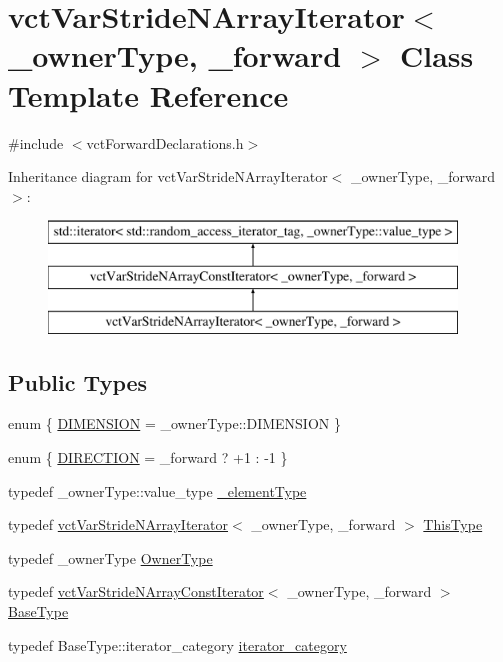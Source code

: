 \hypertarget{classvct_var_stride_n_array_iterator}{}\section{vct\+Var\+Stride\+N\+Array\+Iterator$<$ \+\_\+owner\+Type, \+\_\+forward $>$ Class Template Reference}
\label{classvct_var_stride_n_array_iterator}


{\ttfamily \#include $<$vct\+Forward\+Declarations.\+h$>$}

Inheritance diagram for vct\+Var\+Stride\+N\+Array\+Iterator$<$ \+\_\+owner\+Type, \+\_\+forward $>$\+:\begin{figure}[H]
\begin{center}
\leavevmode
\includegraphics[height=3.000000cm]{dd/dc1/classvct_var_stride_n_array_iterator}
\end{center}
\end{figure}
\subsection*{Public Types}
\begin{DoxyCompactItemize}
\item 
enum \{ \hyperlink{classvct_var_stride_n_array_iterator_a982bcef37bef37c57993bcf62f572b53ada81b91fee86d82f21804a797bc37cdb}{D\+I\+M\+E\+N\+S\+I\+O\+N} = \+\_\+owner\+Type\+:\+:D\+I\+M\+E\+N\+S\+I\+O\+N
 \}
\item 
enum \{ \hyperlink{classvct_var_stride_n_array_iterator_a9fdab4cf642b11877eaf134c251fb782a17cb8d5ba62f2e50e8e6a2e4353434d5}{D\+I\+R\+E\+C\+T\+I\+O\+N} = \+\_\+forward ? +1 \+: -\/1
 \}
\item 
typedef \+\_\+owner\+Type\+::value\+\_\+type \hyperlink{classvct_var_stride_n_array_iterator_ad3f815ae11188c45c85071e5cbd7ee8d}{\+\_\+element\+Type}
\item 
typedef \hyperlink{classvct_var_stride_n_array_iterator}{vct\+Var\+Stride\+N\+Array\+Iterator}$<$ \+\_\+owner\+Type, \+\_\+forward $>$ \hyperlink{classvct_var_stride_n_array_iterator_ae02517903d76b5ea390357e329d7d234}{This\+Type}
\item 
typedef \+\_\+owner\+Type \hyperlink{classvct_var_stride_n_array_iterator_ace0aaa36ae04ab580bdc4b41540f5da8}{Owner\+Type}
\item 
typedef \hyperlink{classvct_var_stride_n_array_const_iterator}{vct\+Var\+Stride\+N\+Array\+Const\+Iterator}$<$ \+\_\+owner\+Type, \+\_\+forward $>$ \hyperlink{classvct_var_stride_n_array_iterator_a23f53d3764feb53f61a458e5f28a78ad}{Base\+Type}
\item 
typedef Base\+Type\+::iterator\+\_\+category \hyperlink{classvct_var_stride_n_array_iterator_a914738ffb87fa950256c5fc39d4cf855}{iterator\+\_\+category}
\end{DoxyCompactItemize}
